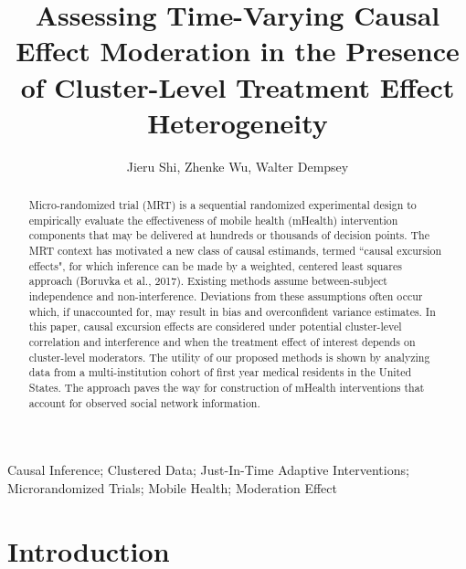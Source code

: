\documentclass[12pt]{article}
\begin{document}
\title{Assessing Time-Varying Causal Effect Moderation in the Presence of Cluster-Level Treatment Effect Heterogeneity}
\author{Jieru Shi, Zhenke Wu, Walter Dempsey}
\maketitle
\begin{abstract}\noindent

Micro-randomized trial (MRT) is a sequential randomized experimental design to empirically evaluate the effectiveness of mobile health (mHealth) intervention components that may be delivered at hundreds or thousands of decision points. The MRT context has motivated a new class of causal estimands, termed ``causal excursion effects", for which inference can be made by a weighted, centered least squares approach (Boruvka et al., 2017). Existing methods assume between-subject independence and non-interference. Deviations from these assumptions often occur which, if unaccounted for, may result in bias and overconfident variance estimates. In this paper, causal excursion effects are considered under potential cluster-level correlation and interference and when the treatment effect of interest depends on cluster-level moderators. The utility of our proposed methods is shown by analyzing data from a multi-institution cohort of first year medical residents in the United States. The approach paves the way for construction of mHealth interventions that account for observed social network information.
\end{abstract}

 Causal Inference; Clustered Data; Just-In-Time Adaptive Interventions; Microrandomized Trials; Mobile Health; Moderation Effect

\section{Introduction}
\end{document}
